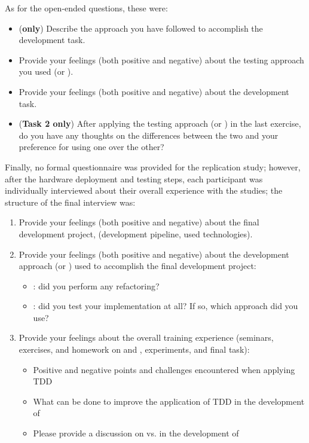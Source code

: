 \noindent As for the open-ended questions, these were:
\begin{itemize}
    \item (\textbf{\notdd only}) Describe the \notdd approach you have followed to accomplish the development task.
    \item Provide your feelings (both positive and negative) about the testing approach you used (\ie \tdd or \notdd).
    \item Provide your feelings (both positive and negative) about the development task.
    \item (\textbf{Task 2 only}) After applying the testing approach (\ie \tdd or \notdd) in the last exercise, do you have any thoughts on the differences between the two and your preference for using one over the other?
\end{itemize}

\noindent Finally, no formal questionnaire was provided for the replication study; however, after the hardware deployment and testing steps, each participant was individually interviewed about their overall experience with the studies; the structure of the final interview was:
\begin{enumerate}
    \item Provide your feelings (both positive and negative) about the final development project, (\eg development pipeline, used technologies).
    \item Provide your feelings (both positive and negative) about the development approach (\ie \tdd or \notdd) used to accomplish the final development project:
        \begin{itemize}
            \item \tdd: did you perform any refactoring? 
            \item \notdd: did you test your implementation at all? If so, which approach did you use?
        \end{itemize}
    \item Provide your feelings about the overall training experience (seminars, exercises, and homework on \tdd and \notdd, experiments, and final task):
        \begin{itemize}
            \item Positive and negative points and challenges encountered when applying TDD
            \item What can be done to improve the application of TDD in the development of \ess
            \item Please provide a discussion on \tdd vs. \notdd in the development of \ess
        \end{itemize}
\end{enumerate}

